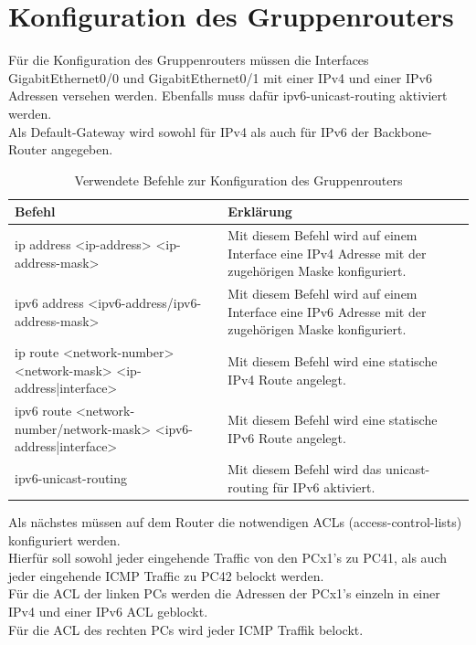 \documentclass{article}
\begin{document}
\pagebreak



\section{Konfiguration des Gruppenrouters}

Für die Konfiguration des Gruppenrouters müssen die Interfaces GigabitEthernet0/0 und GigabitEthernet0/1 mit einer IPv4 und einer IPv6 Adressen versehen werden. Ebenfalls muss dafür ipv6-unicast-routing aktiviert werden.\\
Als Default-Gateway wird sowohl für IPv4 als auch für IPv6 der Backbone-Router angegeben.\\


\begin{table}[htbp]
    \centering
    \begin{tabularx}{\textwidth}{|X|X|}
        \toprule
        \textbf{Befehl} & \textbf{Erklärung} \\
        \midrule
        ip address <ip-address> <ip-address-mask> & Mit diesem Befehl wird auf einem Interface eine IPv4 Adresse mit der zugehörigen Maske konfiguriert.\\
        \hline
        ipv6 address <ipv6-address/ipv6-address-mask> & Mit diesem Befehl wird auf einem Interface eine IPv6 Adresse mit der zugehörigen Maske konfiguriert.\\
        \hline
        ip route <network-number> <network-mask> <ip-address|interface> & Mit diesem Befehl wird eine statische IPv4 Route angelegt.\\
        \hline
        ipv6 route <network-number/network-mask> <ipv6-address|interface> & Mit diesem Befehl wird eine statische IPv6 Route angelegt.\\
        \hline
        ipv6-unicast-routing & Mit diesem Befehl wird das unicast-routing für IPv6 aktiviert.\\
        \bottomrule
    \end{tabularx}
    \caption{Verwendete Befehle zur Konfiguration des Gruppenrouters}
\end{table}

\noindent Als nächstes müssen auf dem Router die notwendigen ACLs (access-control-lists) konfiguriert werden.\\
Hierfür soll sowohl jeder eingehende Traffic von den PCx1's zu PC41, als auch jeder eingehende ICMP Traffic zu PC42 belockt werden.\\
Für die ACL der linken PCs werden die Adressen der PCx1's einzeln in einer IPv4 und einer IPv6 ACL geblockt.\\
Für die ACL des rechten PCs wird jeder ICMP Traffik belockt.\\
\end{document}
